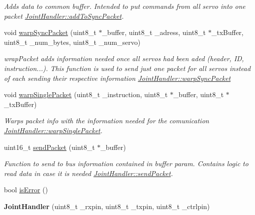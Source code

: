\begin{DoxyCompactItemize}
\begin{DoxyCompactList}\small\item\em Adds data to common buffer. Intended to put commands from all servo into one packet  \hyperlink{classJointHandler_a32b4a64db24964d159890aa4560711db}{Joint\+Handler\+::add\+To\+Sync\+Packet}. \end{DoxyCompactList}\item 
void \hyperlink{classJointHandler_aaaea003506b5d446b81a89924335d8e6}{warp\+Sync\+Packet} (uint8\+\_\+t $\ast$\+\_\+buffer, uint8\+\_\+t \+\_\+adress, uint8\+\_\+t $\ast$\+\_\+tx\+Buffer, uint8\+\_\+t \+\_\+num\+\_\+bytes, uint8\+\_\+t \+\_\+num\+\_\+servo)
\begin{DoxyCompactList}\small\item\em wrap\+Packet adds information needed once all servos had been aded (header, ID, instruction...). This function is used to send just one packet for all servos instead of each sending their respective information  \hyperlink{classJointHandler_aaaea003506b5d446b81a89924335d8e6}{Joint\+Handler\+::warp\+Sync\+Packet} \end{DoxyCompactList}\item 
void \hyperlink{classJointHandler_aab13ed27ee90a1bc5db5f601d58b361c}{warp\+Single\+Packet} (uint8\+\_\+t \+\_\+instruction, uint8\+\_\+t $\ast$\+\_\+buffer, uint8\+\_\+t $\ast$\+\_\+tx\+Buffer)
\begin{DoxyCompactList}\small\item\em Warps packet info with the information needed for the comunication  \hyperlink{classJointHandler_aab13ed27ee90a1bc5db5f601d58b361c}{Joint\+Handler\+::warp\+Single\+Packet}. \end{DoxyCompactList}\item 
uint16\+\_\+t \hyperlink{classJointHandler_a222cfc7c9e451e5d8c2872d7584e9d3e}{send\+Packet} (uint8\+\_\+t $\ast$\+\_\+buffer)
\begin{DoxyCompactList}\small\item\em Function to send to bus information contained in buffer param. Contains logic to read data in case it is needed  \hyperlink{classJointHandler_a222cfc7c9e451e5d8c2872d7584e9d3e}{Joint\+Handler\+::send\+Packet}. \end{DoxyCompactList}\item 
bool \hyperlink{classJointHandler_afeb90e610d4704acc2e8ea8100649778}{is\+Error} ()
\item 
{\bfseries Joint\+Handler} (uint8\+\_\+t \+\_\+rxpin, uint8\+\_\+t \+\_\+txpin, uint8\+\_\+t \+\_\+ctrlpin)\hypertarget{classJointHandler_a8a5900f8e9e6efce5017cee4a0ce3809}{}\label{classJointHandler_a8a5900f8e9e6efce5017cee4a0ce3809}


\end{DoxyCompactItemize}
